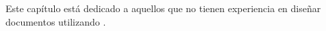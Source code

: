 Este capítulo está dedicado a aquellos que no tienen experiencia en diseñar documentos utilizando \LaTeXe.
